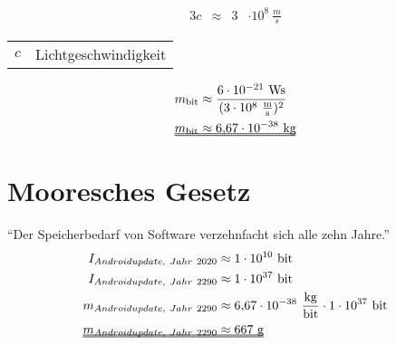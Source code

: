 \documentclass[aspectratio=169]{beamer}
\makeatletter
\newenvironment{conditions}
{\par\vspace{\abovedisplayskip}\noindent\begin{tabular}{>{$}l<{$} @{${}\hspace{0.1cm}.\hspace{0.03cm}.\hspace{0.25cm}{}$} l}}
	{\end{tabular}\par\vspace{\belowdisplayskip}}
\makeatother
\begin{document}
\centering\begin{frame}[fragile]{\insertsection}{\insertsubsection}
\begin{alignat}{3}
c & \approx & 3 & \cdot 10^{8}\ \unit{\frac{m}{s}}
\end{alignat}
\begin{conditions}
	c & Lichtgeschwindigkeit
\end{conditions}
\end{frame}

\centering\begin{frame}[fragile]{\insertsection}{\insertsubsection}
\begin{alignat}{2}
m_{\unit{bit}} & \approx \frac{6 \cdot 10^{-21}\ \unit{Ws}}{(3\cdot 10^8\ \unit{\frac{m}{s}})^2} \\
\makebox[0pt][l]{\uuline{\phantom{$m_{\unit{bit}} \approx 6{,}67 \cdot 10^{-38}\ \unit{kg}$}}}
m_{\unit{bit}} & \approx 6{,}67 \cdot 10^{-38}\ \unit{kg}
\end{alignat}
\end{frame}

\section{Mooresches Gesetz}
\centering\begin{frame}[fragile]{\insertsection}{\insertsubsection}
"`Der Speicherbedarf von Software verzehnfacht sich alle zehn Jahre."'
\begin{alignat}{2}
I_{Androidupdate,\ Jahr\ 2020} & \approx  1  \cdot 10^{10}\ \unit{bit}  \\
I_{Androidupdate,\ Jahr\ 2290} & \approx  1  \cdot 10^{37}\ \unit{bit}  \\
m_{Androidupdate,\ Jahr\ 2290} & \approx  6{,}67  \cdot 10^{-38}\ \unit{\frac{kg}{bit}} \cdot 1 \cdot 10^{37}\ \unit{bit}  \\
\makebox[0pt][l]{\uuline{\phantom{$m_{Androidupdate,\ Jahr\ 2290} \approx  667\ \unit{g}$}}}
m_{Androidupdate,\ Jahr\ 2290} & \approx  667\ \unit{g}
\end{alignat}
\end{frame}
\end{document}
